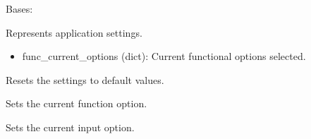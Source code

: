 \documentclass[a4paper,10pt,english]{sphinxmanual}
\begin{document}
\begin{fulllineitems}
\label{\detokenize{src:src.mainwindow.Settings}}
\pysigstartsignatures
{}
\pysigstopsignatures
\sphinxAtStartPar
Bases: 

\sphinxAtStartPar
Represents application settings.
\begin{description}
\begin{itemize}
\item {} 
\sphinxAtStartPar
func\_current\_options (dict): Current functional options selected.

\end{itemize}

\end{description}

\begin{fulllineitems}
\label{\detokenize{src:src.mainwindow.Settings.reset}}
\pysigstartsignatures
{}
\pysigstopsignatures
\sphinxAtStartPar
Resets the settings to default values.

\end{fulllineitems}


\begin{fulllineitems}
\label{\detokenize{src:src.mainwindow.Settings.set_func_option}}
\pysigstartsignatures
{}
\pysigstopsignatures
\sphinxAtStartPar
Sets the current function option.

\end{fulllineitems}


\begin{fulllineitems}
\label{\detokenize{src:src.mainwindow.Settings.set_input_option}}
\pysigstartsignatures
{}
\pysigstopsignatures
\sphinxAtStartPar
Sets the current input option.


\end{fulllineitems}
\end{fulllineitems}
\end{document}
